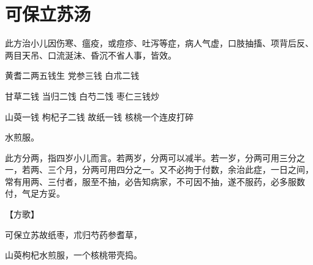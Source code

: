\documentclass[a4paper,12pt,UTF8,twoside]{ctexbook}
\begin{document}
	\section{可保立苏汤}
	
	
	此方治小儿因伤寒、瘟疫，或痘疹、吐泻等症，病人气虚，口肢抽搐、项背后反、两目天吊、口流涎沫、昏沉不省人事，皆效。
	
	黄耆二两五钱生 党参三钱 白朮二钱
	
	甘草二钱 当归二饯 白芍二饯 枣仁三钱炒
	
	山萸一钱 枸杞子二钱 故纸一钱 核桃一个连皮打碎
	
	水煎服。
	
	此方分两，指四岁小儿而言。若两岁，分两可以减半。若一岁，分两可用三分之一，若两、三个月，分两可用四分之一。又不必拘于付数，余治此症，一日之间，常有用两、三付者，服至不抽，必告知病家，不可因不抽，遂不服药，必多服数付，气足方妥。
	
	【方歌】
	
	可保立苏故纸枣，朮归芍药参耆草，
	
	山萸枸杞水煎服，一个核桃带壳捣。
	
\end{document}
